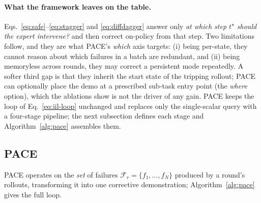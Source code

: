 \documentclass[letterpaper]{article} %
\begin{document}
\paragraph{What the framework leaves on the table.}
Eqs.~\ref{eq:safe}--\ref{eq:stagger} and \ref{eq:diffdagger} answer only \emph{at
which step $t^\star$ should the expert intervene?} and then correct on-policy from
that step. Two limitations follow, and they are what PACE's \emph{which} axis
targets: (i) being per-state, they cannot reason about which failures in a batch are
redundant, and (ii) being memoryless across rounds, they may correct a persistent
mode repeatedly. A softer third gap is that they inherit the start state of the
tripping rollout; PACE can optionally place the demo at a prescribed sub-task entry
point (the \emph{where} option), which the ablations show is not the driver of any
gain. PACE keeps the loop of Eq.~\ref{eq:iil-loop} unchanged and replaces only the
single-scalar query with a four-stage pipeline; the next subsection defines each
stage and Algorithm~\ref{alg:pace} assembles them.

\subsection{PACE}
\label{sec:pace}

PACE operates on the \emph{set} of failures $\mathcal{F}_r=\{f_1,\dots,f_N\}$
produced by a round's rollouts, transforming it into one corrective demonstration;
Algorithm~\ref{alg:pace} gives the full loop.
\end{document}
